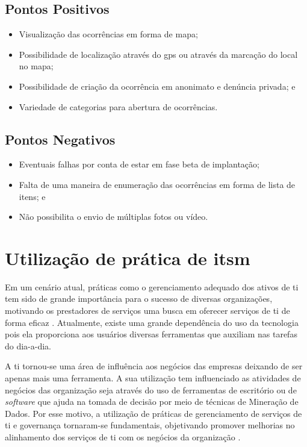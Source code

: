 \subsection*{Pontos Positivos}

\begin{itemize}
    \item Visualização das ocorrências em forma de mapa;
    \item Possibilidade de localização através do \acrshort{gps} ou através da marcação do local no mapa; 
    \item Possibilidade de criação da ocorrência em anonimato e denúncia privada; e
    \item Variedade de categorias para abertura de ocorrências.
\end{itemize}

\subsection*{Pontos Negativos}

\begin{itemize}
    \item Eventuais falhas por conta de estar em fase beta de implantação;
    \item Falta de uma maneira de enumeração das ocorrências em forma de lista de itens; e
    \item Não possibilita o envio de múltiplas fotos ou vídeo.
\end{itemize}

\section{Utilização de prática de  \acrshort{itsm}}

\noindent Em um cenário atual, práticas como o gerenciamento adequado dos ativos de \acrshort{ti} tem sido de grande importância para o sucesso de diversas organizações, motivando os prestadores de serviços uma busca em oferecer serviços de \acrshort{ti} de forma eficaz \cite{introductoryoverviewofitil}. Atualmente, existe uma grande dependência do uso da tecnologia pois ela proporciona aos usuários diversas ferramentas que auxiliam nas tarefas do dia-a-dia.

A \acrshort{ti} tornou-se uma área de influência aos negócios das empresas deixando de ser apenas mais uma ferramenta. A sua utilização tem influenciado as atividades de negócios das organização seja através do uso de ferramentas de escritório ou de \textit{software} que ajuda na tomada de decisão por meio de técnicas de Mineração de Dados. Por esse motivo, a utilização de práticas de gerenciamento de serviços de \acrshort{ti} e governança tornaram-se fundamentais, objetivando promover melhorias no alinhamento dos serviços de \acrshort{ti} com os negócios da organização \cite{servicestrategy, introductoryoverviewofitil}.

